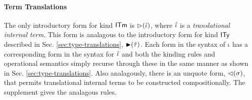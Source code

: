 \documentclass[10pt,preprint]{sigplanconf}
\begin{document}
\paragraph{Term Translations} The only introductory form for kind ${\sf ITm}$ is ${\rhd}(\hat{\iota})$, where $\hat{\iota}$ is a \emph{translational internal term}. This form is analagous to the introductory form for kind ${\sf ITy}$ described in Sec. \ref{sec:type-translations}, ${\blacktriangleright}(\hat{\tau})$. Each form in the syntax of $\iota$ has a corresponding form in the syntax for $\hat{\iota}$ and both the kinding rules and operational semantics simply recurse through these in the same manner as shown in Sec. \ref{sec:type-translations}. Also analagously, there is an unquote form, ${\lhd}(\sigma)$, that permits translational internal terms to be constructed compositionally. The supplement gives the analagous rules.
\end{document}
